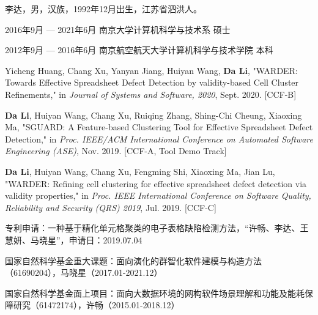 \begin{resume}
  \begin{authorinfo}
  \noindent 李达，男，汉族，1992年12月出生，江苏省泗洪人。
  \end{authorinfo}
  \begin{education}
  \item[2016年9月 --- 2021年6月] 南京大学计算机科学与技术系 \hfill 硕士
  \item[2012年9月 --- 2016年6月] 南京航空航天大学计算机科学与技术学院 \hfill 本科
  \end{education}
  \begin{publications}
    \item Yicheng Huang, Chang Xu, Yanyan Jiang, Huiyan Wang, \textbf{Da Li}, "WARDER: Towards Effective Spreadsheet Defect Detection by validity-based Cell Cluster Refinements," in \textsl{Journal of Systems and Software, 2020}, Sept. 2020. [CCF-B]
    \item \textbf{Da Li}, Huiyan Wang, Chang Xu, Ruiqing Zhang, Shing-Chi Cheung, Xiaoxing Ma, "SGUARD: A Feature-based Clustering Tool for Effective Spreadsheet Defect Detection," in \textsl{Proc. IEEE/ACM International Conference on Automated Software Engineering (ASE)}, Nov. 2019. [CCF-A, Tool Demo Track]
    \item \textbf{Da Li}, Huiyan Wang, Chang Xu, Fengming Shi, Xiaoxing Ma, Jian Lu, "WARDER: Refining cell clustering for effective spreadsheet defect detection via validity properties," in \textsl{Proc. IEEE International Conference on Software Quality, Reliability and Security (QRS) 2019}, Jul. 2019. [CCF-C]
    \item 专利申请：一种基于精化单元格聚类的电子表格缺陷检测方法，“许畅、李达、王慧妍、马晓星”，申请日：2019.07.04  
\end{publications}

\begin{projects}
  \item 国家自然科学基金重大课题：面向演化的群智化软件建模与构造方法（61690204），马晓星（2017.01-2021.12）
  \item 国家自然科学基金面上项目：面向大数据环境的网构软件场景理解和功能及能耗保障研究（61472174），许畅（2015.01-2018.12）
\end{projects}

\end{resume}

